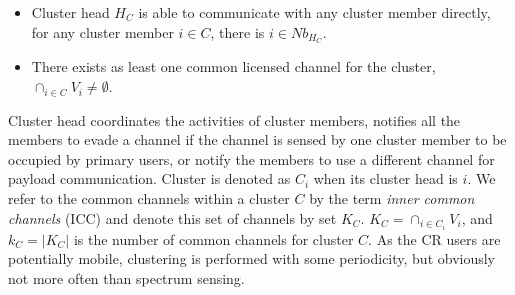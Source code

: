 \begin{itemize}
\item Cluster head $H_C$ is able to communicate with any cluster member directly, \ie for any cluster member $i\in C$, there is $i\in Nb_{H_C}$.
\item There exists as least one common licensed channel for the cluster, \ie $\cap_{i\in C} V_i \neq \emptyset$.
\end{itemize}
Cluster head coordinates the activities of cluster members, \ie notifies all the members to evade a channel if the channel is sensed by one cluster member to be occupied by primary users, or notify the members to use a different channel for payload communication. 
Cluster is denoted as $C_i$ when its cluster head is $i$.
We refer to the common channels within a cluster $C$ by the term \textit{inner common channels} (ICC) and denote this set of channels by set $K_C$.
$ K_C = \cap_{i\in C_i} V_i$, and $k_C = |K_C|$ is the number of common channels for cluster $C$.
As the CR users are potentially mobile, clustering is performed with some periodicity, but obviously not more often than spectrum sensing.









